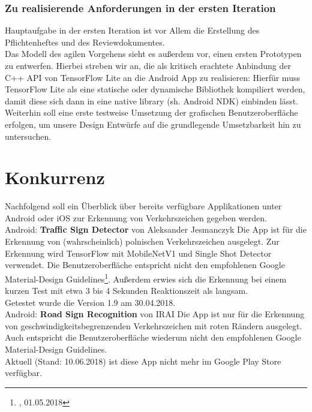 \subsection{Zu realisierende Anforderungen in der ersten Iteration}
Hauptaufgabe in der ersten Iteration ist vor Allem die Erstellung des Pflichtenheftes und des Reviewdokumentes.\\
Das Modell des agilen Vorgehens sieht es außerdem vor, einen ersten Prototypen zu entwerfen. Hierbei streben wir an, die als kritisch erachtete Anbindung der C++ \gls{API} von \gls{TensorFlow Lite} an die Android \gls{App} zu realisieren: Hierfür muss \gls{TensorFlow Lite} als eine statische oder dynamische Bibliothek kompiliert werden, damit diese sich dann in eine native library (sh. Android NDK) einbinden lässt. Weiterhin soll eine erste testweise Umsetzung der grafischen Benutzeroberfläche erfolgen, um unsere Design Entwürfe auf die grundlegende Umsetzbarkeit hin zu untersuchen.

\chapter{Konkurrenz}

Nachfolgend soll ein Überblick über bereits verfügbare Applikationen unter Android oder iOS zur Erkennung von Verkehrszeichen gegeben werden.\\

Android: \textbf{\glqq{}Traffic Sign Detector\grqq{}} von \glqq{}Aleksander Jesmanczyk\grqq{}
\hline\vspace{4pt}
Die \gls{App} ist für die Erkennung von (wahrscheinlich) polnischen Verkehrszeichen ausgelegt. Zur Erkennung wird TensorFlow mit MobileNetV1 und Single Shot Detector verwendet. Die Benutzeroberfläche entspricht nicht den empfohlenen Google Material-Design Guidelines\footnote{\label{foot:guideline}, 01.05.2018}. Außerdem erwies sich die Erkennung bei einem kurzen Test mit etwa 3 bis 4 Sekunden Reaktionszeit als langsam.\\
Getestet wurde die Version 1.9 am 30.04.2018.\\

Android: \textbf{\glqq{}Road Sign Recognition\grqq{}} von \glqq{}IRAI\grqq{}
\hline\vspace{4pt}
Die \gls{App} ist nur für die Erkennung von geschwindigkeitsbegrenzenden Verkehrszeichen mit roten Rändern ausgelegt. Auch entspricht die Benutzeroberfläche wiederum nicht den empfohlenen Google Material-Design Guidelines.\\
Aktuell (Stand: 10.06.2018) ist diese \gls{App} nicht mehr im Google Play Store verfügbar.\\

